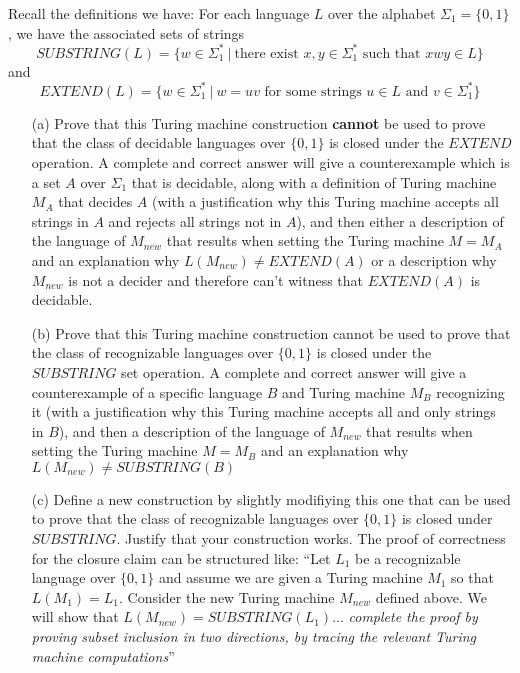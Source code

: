 \begin{enumerate}[wide, labelwidth=!, labelindent=0pt]
Recall the definitions we have:   For each language $L$ over the alphabet $\Sigma_1 = \{0,1\}$, we have the 
associated sets of strings
  $$SUBSTRING(L) = \{ w \in \Sigma_1^* ~|~ \text{there exist } x,y \in \Sigma_1^* \text{ such that } xwy \in L\}$$
and 
  $$EXTEND(L) = \{ w \in \Sigma_1^* ~|~ w = uv \text{ for some strings } u \in L \text{ and } v \in \Sigma_1^* \}$$

\begin{enumerate}
\item[(a)]\gradeCorrect Prove that this Turing machine construction 
{\bf cannot} be used to prove that the
class of decidable languages over $\{0,1\}$ is closed under the 
$EXTEND$ operation.
A complete and correct answer will give a counterexample which is a set $A$ over $\Sigma_1$ that  is decidable, along with a definition of Turing machine $M_A$ 
that decides $A$ 
(with a justification why this Turing machine accepts all 
strings in $A$ and rejects all strings not in $A$), and then either a description of the language of $M_{new}$ that results when setting the Turing machine $M = M_A$ and an explanation why $L(M_{new}) \neq EXTEND(A)$ or 
a description why $M_{new}$ is not a decider and therefore can't witness that $EXTEND(A)$ is decidable.

\item[(b)] \gradeCorrect Prove that this Turing machine construction cannot be used to prove that the
class of recognizable languages over $\{0,1\}$ is closed under the $SUBSTRING$ set operation. A complete and correct answer will 
give a counterexample of a specific language $B$ and Turing machine $M_B$ 
recognizing it
(with a justification why this Turing machine accepts all and only strings in $B$), and then a description of the language of $M_{new}$ that results when 
setting the Turing machine $M = M_B$ and an explanation why $L(M_{new}) \neq SUBSTRING(B)$

\item[(c)] \gradeComplete Define a new construction by slightly modifiying this one that can be used to prove  that the
class of recognizable languages over $\{0,1\}$ is closed under $SUBSTRING$. Justify that 
your construction works. The proof of correctness for the closure claim can be structured like: 
``Let $L_1 $ be a recognizable language over $\{0,1\}$ and 
assume we are given a Turing machine $M_1$ so that $L(M_1) = L_1$. Consider the new Turing machine 
$M_{new}$ defined above. We will show that $L(M_{new}) = SUBSTRING(L_1) $... {\it complete the proof
by proving subset inclusion in two directions, by tracing the relevant Turing machine computations}''


\end{enumerate}
\end{enumerate}
